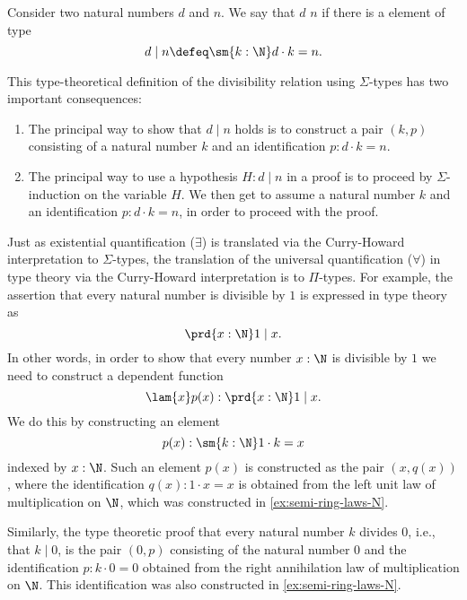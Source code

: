 \begin{defn}
  Consider two natural numbers $d$ and $n$. We say that $d$  $n$ if there is a element of type
  \begin{equation*}
    d\mid n\defeq \sm{k:\N}d\cdot k=n.
  \end{equation*}
\end{defn}

\begin{rmk}
  This type-theoretical definition of the divisibility relation using $\Sigma$-types has two important consequences:
  \begin{enumerate}
  \item The principal way to show that $d\mid n$ holds is to construct a pair $(k,p)$ consisting of a natural number $k$ and an identification $p:d\cdot k=n$.
  \item The principal way to use a hypothesis $H:d\mid n$ in a proof is to proceed by $\Sigma$-induction on the variable $H$. We then get to assume a natural number $k$ and an identification $p:d\cdot k=n$, in order to proceed with the proof.
  \end{enumerate}
\end{rmk}

\begin{eg}\label{rmk:elementary-facts-div}
  Just as existential quantification ($\exists$) is translated via the Curry-Howard interpretation to $\Sigma$-types, the translation of the universal quantification ($\forall$) in type theory via the Curry-Howard interpretation is to $\Pi$-types. For example, the assertion that every natural number is divisible by $1$ is expressed in type theory as
  \begin{equation*}
    \prd{x:\N} 1\mid x.
  \end{equation*}
  In other words, in order to show that every number $x:\N$ is divisible by $1$ we need to construct a dependent function
  \begin{equation*}
    \lam{x}p(x):\prd{x:\N}1\mid x.
  \end{equation*}
  We do this by constructing an element
  \begin{equation*}
    p(x):\sm{k:\N}1\cdot k=x
  \end{equation*}
  indexed by $x:\N$. Such an element $p(x)$ is constructed as the pair $(x,q(x))$, where the identification $q(x):1\cdot x=x$ is obtained from the left unit law of multiplication on $\N$, which was constructed in \cref{ex:semi-ring-laws-N}.

  Similarly, the type theoretic proof that every natural number $k$ divides $0$, i.e., that $k\mid 0$, is the pair $(0,p)$ consisting of the natural number $0$ and the identification $p:k\cdot 0=0$ obtained from the right annihilation law of multiplication on $\N$. This identification was also constructed in \cref{ex:semi-ring-laws-N}.
\end{eg}

